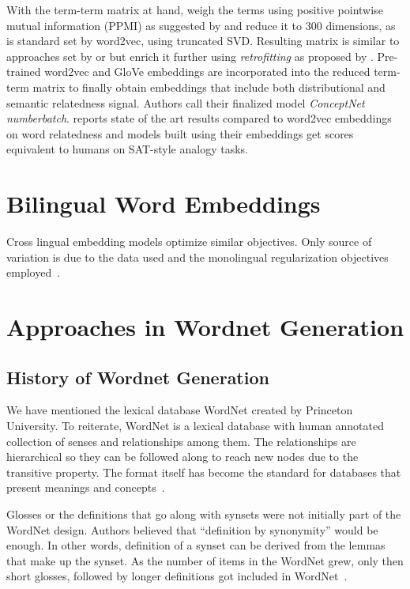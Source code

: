 With the term-term matrix at hand, \citeauthor{speer_conceptnet_2017} weigh the terms using positive pointwise mutual information (PPMI) as suggested by \textcite{levy_improving_2015} and reduce it to 300 dimensions, as is standard set by word2vec, using truncated SVD\@.
Resulting matrix is similar to approaches set by \textcite{deerwester_indexing_1990} or \textcite{pennington_glove_2014} but \citeauthor{speer_conceptnet_2017} enrich it further using \emph{retrofitting} as proposed by \textcite{faruqui_improving_2014}.
Pre-trained word2vec and GloVe embeddings are incorporated into the reduced term-term matrix to finally obtain embeddings that include both distributional and semantic relatedness signal.
Authors call their finalized model \emph{ConceptNet numberbatch}.
\citeauthor{speer_conceptnet_2017} reports state of the art results compared to word2vec embeddings on word relatedness and models built using their embeddings get scores equivalent to humans on SAT-style analogy tasks.

\section{Bilingual Word Embeddings}%
\label{sec:bilingual_word_embeddings}

Cross lingual embedding models optimize similar objectives.
Only source of variation is due to the data used and the monolingual regularization objectives employed~\cite{ruder_survey_2017}.

\section{Approaches in Wordnet Generation}%
\label{sec:approaches_in_wordnet_generation}

\subsection{History of Wordnet Generation}%
\label{sub:history_of_wordnet_generation}

We have mentioned the lexical database WordNet created by Princeton University.
To reiterate, WordNet is a lexical database with human annotated collection of senses and relationships among them.
The relationships are hierarchical so they can be followed along to reach new nodes due to the transitive property.
The format itself has become the standard for databases that present meanings and concepts~\cite{neale_survey_2018}.

Glosses or the definitions that go along with synsets were not initially part of the WordNet design.
Authors believed that \enquote{definition by synonymity} would be enough.
In other words, definition of a synset can be derived from the lemmas that make up the synset.
As the number of items in the WordNet grew, only then short glosses, followed by longer definitions got included in WordNet~\cite{fellbaum_wordnet_1998}.


